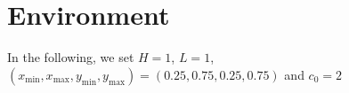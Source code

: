 \section{Environment}

In the following, we set $H=1$, $L=1$, $(x_\text{min}, x_\text{max}, y_\text{min}, y_\text{max}) = (0.25, 0.75, 0.25, 0.75)$ and $c_0 = 2$ 
%
%
%
%
%
%
